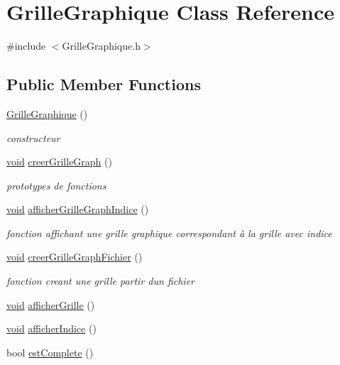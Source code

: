 \hypertarget{class_grille_graphique}{}\section{Grille\+Graphique Class Reference}
\label{class_grille_graphique}


{\ttfamily \#include $<$Grille\+Graphique.\+h$>$}

\subsection*{Public Member Functions}
\begin{DoxyCompactItemize}
\item 
\hyperlink{class_grille_graphique_a6df01dd35afe7052e912676655584ecf}{Grille\+Graphique} ()
\begin{DoxyCompactList}\small\item\em constructeur \end{DoxyCompactList}\item 
\hyperlink{_s_d_l__opengl_8h_a3db05964a3cc4410f35b7ea2b7eb850d}{void} \hyperlink{class_grille_graphique_a932304a7a959bd6acb760a66087dd0d9}{creer\+Grille\+Graph} ()
\begin{DoxyCompactList}\small\item\em prototypes de fonctions \end{DoxyCompactList}\item 
\hyperlink{_s_d_l__opengl_8h_a3db05964a3cc4410f35b7ea2b7eb850d}{void} \hyperlink{class_grille_graphique_a694e03b0babf76d5ff06bb66f3d0e4e0}{afficher\+Grille\+Graph\+Indice} ()
\begin{DoxyCompactList}\small\item\em fonction affichant une grille graphique correspondant à la grille avec indice \end{DoxyCompactList}\item 
\hyperlink{_s_d_l__opengl_8h_a3db05964a3cc4410f35b7ea2b7eb850d}{void} \hyperlink{class_grille_graphique_aede21175167b3ddfe5856c4165c30e37}{creer\+Grille\+Graph\+Fichier} ()
\begin{DoxyCompactList}\small\item\em fonction creant une grille partir d\textquotesingle{}un fichier \end{DoxyCompactList}\item 
\hyperlink{_s_d_l__opengl_8h_a3db05964a3cc4410f35b7ea2b7eb850d}{void} \hyperlink{class_grille_graphique_a616fe2fde34ef390ee556f90b9d5b9a6}{afficher\+Grille} ()
\item 
\hyperlink{_s_d_l__opengl_8h_a3db05964a3cc4410f35b7ea2b7eb850d}{void} \hyperlink{class_grille_graphique_aba36814abd568b7d490947a91d5eef2f}{afficher\+Indice} ()
\item 
bool \hyperlink{class_grille_graphique_afa97fdbd2f7b8d7f3c2304f7ea6ccdb0}{est\+Complete} ()
\end{DoxyCompactItemize}
